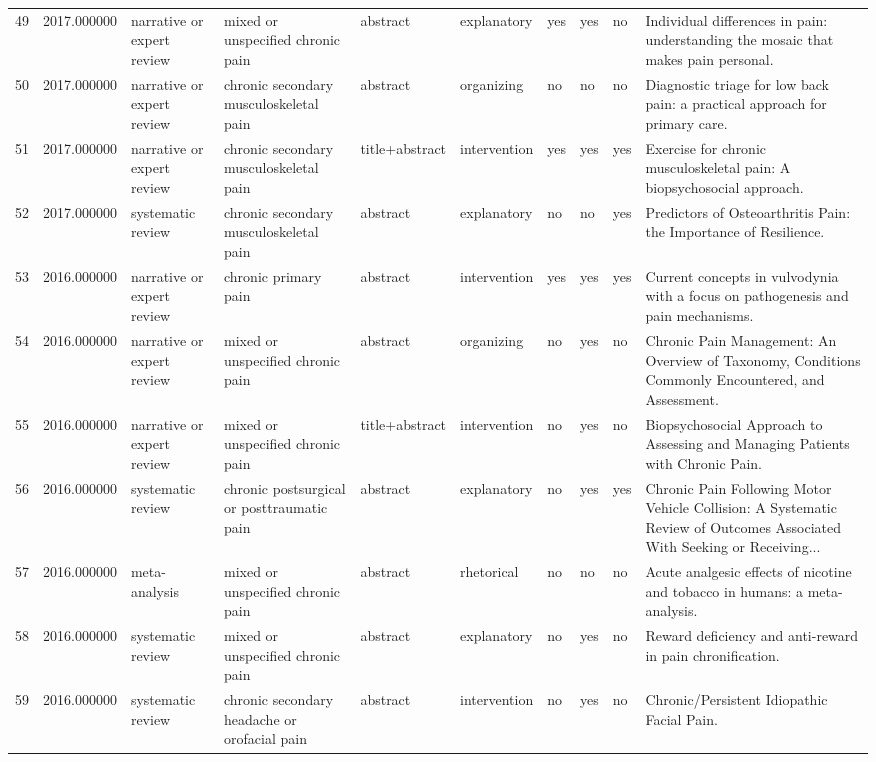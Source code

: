 \begin{longtable}{p{0.7cm}p{0.7cm}p{1.2cm}p{1.9cm}p{1.3cm}p{1.5cm}p{0.55cm}p{0.55cm}p{0.55cm}p{3.2cm}}
49 & 2017.000000 & narrative or expert review & mixed or unspecified chronic pain & abstract & explanatory & yes & yes & no & Individual differences in pain: understanding the mosaic that makes pain personal. \\
50 & 2017.000000 & narrative or expert review & chronic secondary musculoskeletal pain & abstract & organizing & no & no & no & Diagnostic triage for low back pain: a practical approach for primary care. \\
51 & 2017.000000 & narrative or expert review & chronic secondary musculoskeletal pain & title+abstract & intervention & yes & yes & yes & Exercise for chronic musculoskeletal pain: A biopsychosocial approach. \\
52 & 2017.000000 & systematic review & chronic secondary musculoskeletal pain & abstract & explanatory & no & no & yes & Predictors of Osteoarthritis Pain: the Importance of Resilience. \\
53 & 2016.000000 & narrative or expert review & chronic primary pain & abstract & intervention & yes & yes & yes & Current concepts in vulvodynia with a focus on pathogenesis and pain mechanisms. \\
54 & 2016.000000 & narrative or expert review & mixed or unspecified chronic pain & abstract & organizing & no & yes & no & Chronic Pain Management: An Overview of Taxonomy, Conditions Commonly Encountered, and Assessment. \\
55 & 2016.000000 & narrative or expert review & mixed or unspecified chronic pain & title+abstract & intervention & no & yes & no & Biopsychosocial Approach to Assessing and Managing Patients with Chronic Pain. \\
56 & 2016.000000 & systematic review & chronic postsurgical or posttraumatic pain & abstract & explanatory & no & yes & yes & Chronic Pain Following Motor Vehicle Collision: A Systematic Review of Outcomes Associated With Seeking or Receiving... \\
57 & 2016.000000 & meta-analysis & mixed or unspecified chronic pain & abstract & rhetorical & no & no & no & Acute analgesic effects of nicotine and tobacco in humans: a meta-analysis. \\
58 & 2016.000000 & systematic review & mixed or unspecified chronic pain & abstract & explanatory & no & yes & no & Reward deficiency and anti-reward in pain chronification. \\
59 & 2016.000000 & systematic review & chronic secondary headache or orofacial pain & abstract & intervention & no & yes & no & Chronic/Persistent Idiopathic Facial Pain. \\

\end{longtable}
